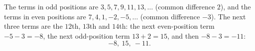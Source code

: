The terms in odd positions are $3,5,7,9,11,13,\dots$ (common difference $2$), and the terms in even positions are $7,4,1,-2,-5,\dots$ (common difference $-3$). The next three terms are the $12$th, $13$th and $14$th: the next even-position term $-5-3=-8$, the next odd-position term $13+2=15$, and then $-8-3=-11$:
\[\boxed{-8,\ 15,\ -11}.\]
